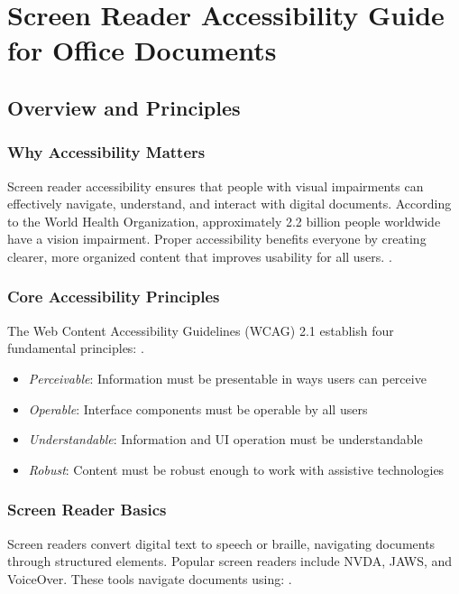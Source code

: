 \chapter{Screen Reader Accessibility Guide for Office Documents}
\label{chap:screenreader-office}

\section{Overview and Principles}
\label{sec:overview-principles}

\subsection{Why Accessibility Matters}
Screen reader accessibility ensures that people with visual impairments can effectively navigate, understand, and interact with digital documents. According to the World Health Organization, approximately 2.2 billion people worldwide have a vision impairment. Proper accessibility benefits everyone by creating clearer, more organized content that improves usability for all users.
\cite{WHO2021}.

\subsection{Core Accessibility Principles}
The Web Content Accessibility Guidelines (WCAG) 2.1 establish four fundamental principles:
\cite{WCAG2018}.

\begin{itemize}
\item \emph{Perceivable}: Information must be presentable in ways users can perceive
\item \emph{Operable}: Interface components must be operable by all users
\item \emph{Understandable}: Information and UI operation must be understandable
\item \emph{Robust}: Content must be robust enough to work with assistive technologies
\end{itemize}

\subsection{Screen Reader Basics}
Screen readers convert digital text to speech or braille, navigating documents through structured elements. Popular screen readers include NVDA, JAWS, and VoiceOver. These tools navigate documents using:
\cite{NVDA2023, JAWS2023, VoiceOver2023}.

